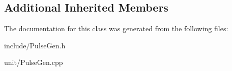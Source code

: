 \subsection*{Additional Inherited Members}


The documentation for this class was generated from the following files\+:\begin{DoxyCompactItemize}
\item 
include/Pulse\+Gen.\+h\item 
unit/Pulse\+Gen.\+cpp\end{DoxyCompactItemize}
